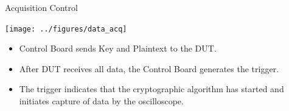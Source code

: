 \documentclass[xcolor=pdftex,dvipsnames,table,final]{beamer}
\begin{document}
\begin{frame}[fragile]{}
\begin{columns}[t]
\begin{column}{.31\linewidth}
      \begin{block}{Acquisition Control}
        \begin{center}
          \texttt{[image: ../figures/data\_acq]}
        \end{center} 
        \begin{itemize}
          \item Control Board sends Key and Plaintext to the DUT.
          \item After DUT receives all data, the Control Board generates the trigger.
          \item The trigger indicates that the cryptographic algorithm has started
                and initiates capture of data by the oscilloscope.
        \end{itemize}
       \end{block}
     
          
    \end{column}
   \begin{column}{.31\linewidth}
    

\end{column}
\end{columns}
\end{frame}
\end{document}
